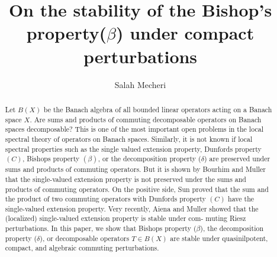 \documentclass[12pt,a4paper]{amsart}
\begin{document}
\title[On the stability of the Bishop's property ($\beta$)]
{On the stability of the Bishop's property($\beta$) under compact
perturbations}
\author[S.Mecheri ]{Salah Mecheri}
\address{Department of Mathematics\\
Faculty of Science and Informatics\\
El Bachir Ibrahimi University, Bordj Bou Arreridj, Algeria.}
\dedicatory{} 
\begin{abstract}
Let $B(X)$ be the Banach algebra of all bounded linear operators
acting on a Banach space $X$. Are sums and products of commuting
decomposable operators on Banach spaces decomposable? This is one
of the most important open problems in the local spectral theory
of operators on Banach spaces. Similarly, it is not known if local
spectral properties such as the single valued extension property,
Dunfords property $(C)$, Bishops property $(\beta)$, or the
decomposition property ($\delta$) are preserved under sums and
products of commuting operators. But it is shown by Bourhim and
Muller that the single-valued extension property is not preserved
under the sums and products of commuting operators. On the
positive side, Sun proved that the sum and the product of two
commuting operators with Dunfords property $(C)$ have the
single-valued extension property. Very recently, Aiena and Muller
showed that the (localized) single-valued extension property is
stable under com- muting Riesz perturbations. In this paper, we
show that Bishops property ($\beta$), the decomposition property
($\delta$), or decomposable operators $T\in B(X)$ are stable under
quasinilpotent, compact, and algebraic commuting perturbations.
\end{abstract}
 \maketitle
\end{document}
